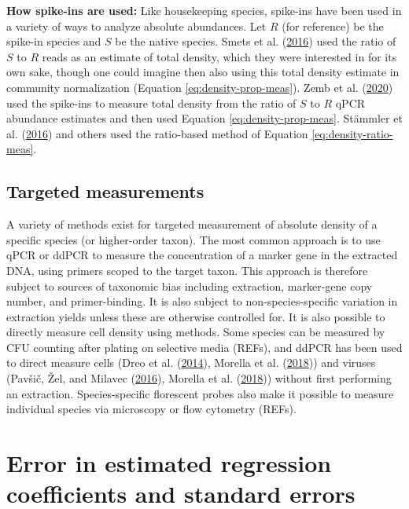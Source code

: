 \documentclass[
]{article}
\begin{document}
\textbf{How spike-ins are used:}
Like housekeeping species, spike-ins have been used in a variety of ways to analyze absolute abundances.
Let \(R\) (for reference) be the spike-in species and \(S\) be the native species.
Smets et al. (\protect\hyperlink{ref-smets2016amet}{2016}) used the ratio of \(S\) to \(R\) reads as an estimate of total density, which they were interested in for its own sake, though one could imagine then also using this total density estimate in community normalization (Equation \eqref{eq:density-prop-meas}).
Zemb et al. (\protect\hyperlink{ref-zemb2020abso}{2020}) used the spike-ins to measure total density from the ratio of \(S\) to \(R\) qPCR abundance estimates and then used Equation \eqref{eq:density-prop-meas}.
Stämmler et al. (\protect\hyperlink{ref-stammler2016adju}{2016}) and others used the ratio-based method of Equation \eqref{eq:density-ratio-meas}.

\hypertarget{targeted-measurements}{%
\subsection{Targeted measurements}\label{targeted-measurements}}

A variety of methods exist for targeted measurement of absolute density of a specific species (or higher-order taxon).
The most common approach is to use qPCR or ddPCR to measure the concentration of a marker gene in the extracted DNA, using primers scoped to the target taxon.
This approach is therefore subject to sources of taxonomic bias including extraction, marker-gene copy number, and primer-binding.
It is also subject to non-species-specific variation in extraction yields unless these are otherwise controlled for.
It is also possible to directly measure cell density using methods.
Some species can be measured by CFU counting after plating on selective media (REFs), and ddPCR has been used to direct measure cells (Dreo et al. (\protect\hyperlink{ref-dreo2014opti}{2014}), Morella et al. (\protect\hyperlink{ref-morella2018rapi}{2018})) and viruses (Pavšič, Žel, and Milavec (\protect\hyperlink{ref-pavsic2016digi}{2016}), Morella et al. (\protect\hyperlink{ref-morella2018rapi}{2018})) without first performing an extraction.
Species-specific florescent probes also make it possible to measure individual species via microscopy or flow cytometry (REFs).

\hypertarget{appendix-regression}{%
\section{Error in estimated regression coefficients and standard errors}\label{appendix-regression}}
\end{document}
